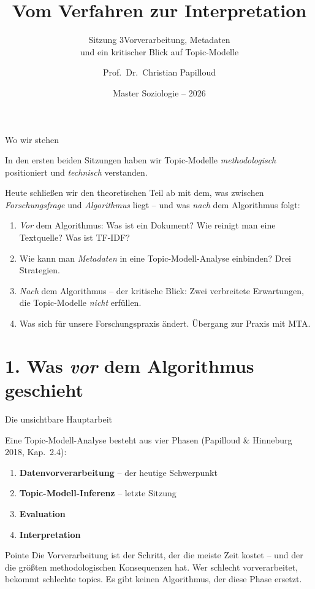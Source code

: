 \documentclass[aspectratio=169,11pt]{beamer}
\title{Vom Verfahren zur Interpretation}
\subtitle{Sitzung 3\mdash{}Vorverarbeitung, Metadaten\\und ein kritischer Blick auf Topic-Modelle}
\author{Prof.~Dr.~Christian Papilloud}
\institute{Institut für Soziologie\\Martin-Luther-Universität Halle-Wittenberg}
\date{Master Soziologie – 2026}
\let\oldemph\emph
\renewcommand{\emph}[1]{{\color{solCyan}\oldemph{#1}}}
\let\oldtextbf\textbf
\renewcommand{\textbf}[1]{{\color{solBase3}\oldtextbf{#1}}}
\begin{document}
\begin{frame}[plain]
  \titlepage
\end{frame}

\begin{frame}{Wo wir stehen}

  In den ersten beiden Sitzungen haben wir Topic-Modelle
  \emph{methodologisch} positioniert und \emph{technisch}
  verstanden.

  \vfill
  Heute schließen wir den theoretischen Teil ab mit dem, was
  zwischen \emph{Forschungsfrage} und \emph{Algorithmus} liegt –
  und was \emph{nach} dem Algorithmus folgt:

  \vfill
  \begin{enumerate}
    \item[\textbf{1.}] \emph{Vor} dem Algorithmus:
          Was ist ein Dokument? Wie reinigt man eine Textquelle?
          Was ist TF-IDF?
    \item[\textbf{2.}] Wie kann man \emph{Metadaten} in eine
          Topic-Modell-Analyse einbinden? Drei Strategien.
    \item[\textbf{3.}] \emph{Nach} dem Algorithmus – der kritische
          Blick: Zwei verbreitete Erwartungen, die Topic-Modelle
          \emph{nicht} erfüllen.
    \item[\textbf{4.}] Was sich für unsere Forschungspraxis ändert.
          Übergang zur Praxis mit MTA.
  \end{enumerate}

\end{frame}

\section{1. Was \emph{vor} dem Algorithmus geschieht}

\begin{frame}{Die unsichtbare Hauptarbeit}

  Eine Topic-Modell-Analyse besteht aus vier Phasen
  (Papilloud \& Hinneburg 2018, Kap.\ 2.4):

  \vfill
  \begin{enumerate}
    \item \textbf{Datenvorverarbeitung} \hfill – der heutige Schwerpunkt
    \item \textbf{Topic-Modell-Inferenz} \hfill – letzte Sitzung
    \item \textbf{Evaluation}
    \item \textbf{Interpretation}
  \end{enumerate}

  \vfill
  \begin{block}{Pointe}
    Die Vorverarbeitung ist der Schritt, der die meiste Zeit kostet –
    und der die größten methodologischen Konsequenzen hat. Wer schlecht
    vorverarbeitet, bekommt schlechte topics. Es gibt keinen Algorithmus,
    der diese Phase ersetzt.
  \end{block}

\end{frame}
\end{document}
